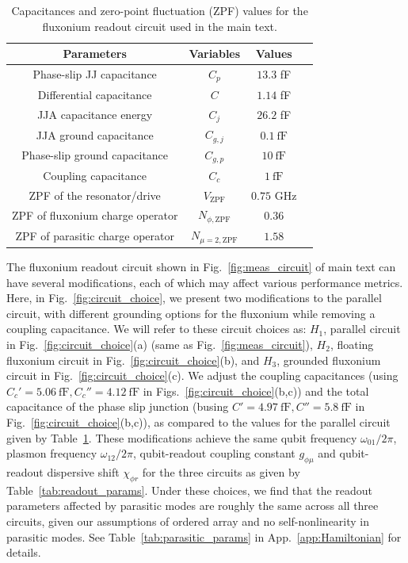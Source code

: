 \documentclass[%
reprint,
superscriptaddress,
 amsmath,amssymb,
 aps,
 prx,
longbibliography,
floatfix,
]{revtex4-2}
\begin{document}
\begin{table}[htb]
    \begin{center}
    \begin{tabular}{|c |c| c |c| }
     \hline
     \textbf{Parameters} & \textbf{Variables} & \textbf{Values}\\ 
    \hline
    Phase-slip JJ capacitance &$C_p$ &$13.3$ fF\\ 
    \hline
    Differential capacitance &$C$ &$1.14$ fF\\ 
    \hline
    JJA capacitance energy&$C_j$&$26.2$ fF\\ 
    \hline
    JJA ground capacitance&$C_{g,j}$&$0.1 \ \mathrm{fF}$\\ 
    \hline
    Phase-slip ground capacitance&$C_{g,p}$&$10 \ \mathrm{fF}$\\ 
    \hline
    Coupling capacitance&$C_c$ &$1 \ \mathrm{fF}$\\ 
     \hline
      ZPF of the resonator/drive&$V_{\mathrm{ZPF}}$&$0.75$ GHz\\
     \hline
      ZPF of fluxonium charge operator&$N_{\phi,\mathrm{ZPF}}$&$0.36$\\
     \hline
      ZPF of parasitic charge operator&$N_{\mu=2,\mathrm{ZPF}}$&$1.58$\\
     \hline
    \end{tabular}
    \end{center}
    
    \caption{Capacitances and zero-point fluctuation (ZPF) values for the fluxonium readout circuit used in the main text.}
    \label{tab:params}
    \end{table}
The fluxonium readout circuit shown in Fig.~\ref{fig:meas_circuit} of main text can have several modifications, each of which may affect various performance metrics. Here, in Fig.~\ref{fig:circuit_choice}, we present two modifications to the parallel circuit, with different grounding options for the fluxonium while removing a coupling capacitance. We will refer to these circuit choices as: $H_1$, parallel circuit in Fig.~\ref{fig:circuit_choice}(a) (same as Fig.~\ref{fig:meas_circuit}), $H_2$, floating fluxonium circuit in Fig.~\ref{fig:circuit_choice}(b), and $H_3$, grounded fluxonium circuit in Fig.~\ref{fig:circuit_choice}(c). We adjust the coupling capacitances (using $C_c'=5.06 \ \mathrm{fF},C_c''=4.12 \ \mathrm{fF}$ in Figs.~\ref{fig:circuit_choice}(b,c)) and the total capacitance of the phase slip junction (busing $C'=4.97 \ \mathrm{fF},C''=5.8 \ \mathrm{fF}$ in Fig.~\ref{fig:circuit_choice}(b,c)), as compared to the values for the parallel circuit given by Table~\ref{tab:params}. These modifications achieve the same qubit frequency $\omega_{01}/2\pi$, plasmon frequency $\omega_{12}/2\pi$, qubit-readout coupling constant $g_{\phi \mu}$ and qubit-readout dispersive shift $\chi_{\phi r}$ for the three circuits as given by Table~\ref{tab:readout_params}. Under these choices, we find that the readout parameters affected by parasitic modes are roughly the same across all three circuits, given our assumptions of ordered array and no self-nonlinearity in parasitic modes. See Table~\ref{tab:parasitic_params} in App.~\ref{app:Hamiltonian} for details. 
\end{document}
